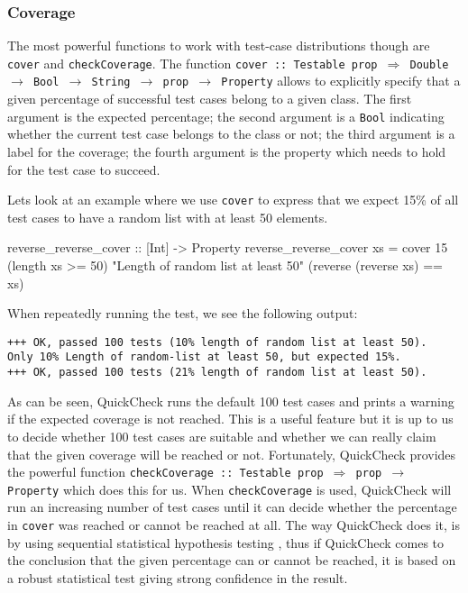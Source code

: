 \subsubsection{Coverage}
The most powerful functions to work with test-case distributions though are \texttt{cover} and \texttt{checkCoverage}. The function \texttt{cover :: Testable prop $\Rightarrow$ Double $\rightarrow$ Bool $\rightarrow$ String $\rightarrow$ prop $\rightarrow$ Property} allows to explicitly specify that a given percentage of successful test cases belong to a given class. The first argument is the expected percentage; the second argument is a \texttt{Bool} indicating whether the current test case belongs to the class or not; the third argument is a label for the coverage; the fourth argument is the property which needs to hold for the test case to succeed. 

Lets look at an example where we use \texttt{cover} to express that we expect 15\% of all test cases to have a random list with at least 50 elements.

\begin{HaskellCode}
reverse_reverse_cover :: [Int] -> Property
reverse_reverse_cover xs  
  = cover 15 (length xs >= 50) "Length of random list at least 50"
             (reverse (reverse xs) == xs)
\end{HaskellCode}

When repeatedly running the test, we see the following output:

\begin{verbatim}
+++ OK, passed 100 tests (10% length of random list at least 50).
Only 10% Length of random-list at least 50, but expected 15%.
+++ OK, passed 100 tests (21% length of random list at least 50).
\end{verbatim}

As can be seen, QuickCheck runs the default 100 test cases and prints a warning if the expected coverage is not reached. This is a useful feature but it is up to us to decide whether 100 test cases are suitable and whether we can really claim that the given coverage will be reached or not. Fortunately, QuickCheck provides the powerful function \texttt{checkCoverage :: Testable prop $\Rightarrow$ prop $\rightarrow$ Property} which does this for us. When \texttt{checkCoverage} is used, QuickCheck will run an increasing number of test cases until it can decide whether the percentage in \texttt{cover} was reached or cannot be reached at all. The way QuickCheck does it, is by using sequential statistical hypothesis testing \cite{wald_sequential_1992}, thus if QuickCheck comes to the conclusion that the given percentage can or cannot be reached, it is based on a robust statistical test giving strong confidence in the result.

